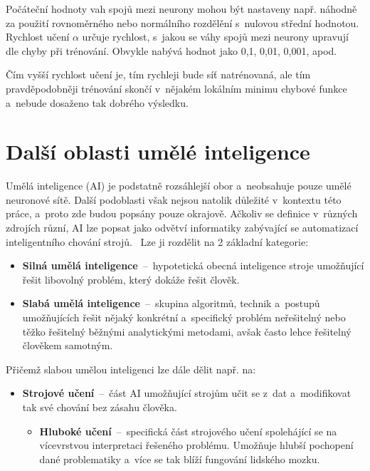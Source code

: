\documentclass[a4paper,12pt]{article}
\begin{document}
{{{{{{{{Počáteční hodnoty vah spojů mezi neurony mohou být nastaveny např. náhodně za použití rovnoměrného nebo normálního rozdělění s~nulovou střední hodnotou. Rychlost učení $\alpha$ určuje rychlost, s~jakou se váhy spojů mezi neurony upravují dle chyby při trénování. Obvykle nabývá hodnot jako 0,1, 0,01, 0,001, apod.~\cite{nn}

Čím vyšší rychlost učení je, tím rychleji bude síť natrénovaná, ale tím pravděpodobněji trénování skončí v~nějakém lokálním minimu chybové funkce a~nebude dosaženo tak dobrého výsledku.~\cite{convnn}

\section{Další oblasti umělé inteligence}

Umělá inteligence (AI) je podstatně rozsáhlejší obor a~neobsahuje pouze umělé neuronové sítě. Další podoblasti však nejsou natolik důležité v~kontextu této práce, a~proto zde budou popsány pouze okrajově. Ačkoliv se definice v~různých zdrojích různí, AI lze popsat jako odvětví informatiky zabývající se automatizací inteligentního chování strojů.~\cite{ai} Lze ji rozdělit na 2 základní kategorie:

\begin{itemize}
\item \textbf{Silná umělá inteligence}~--~hypotetická obecná inteligence stroje umožňující řešit libovolný problém, který dokáže řešit člověk.
\item \textbf{Slabá umělá inteligence}~--~skupina algoritmů, technik a~postupů umožňujících řešit nějaký konkrétní a~specifický problém neřešitelný nebo těžko řešitelný běžnými analytickými metodami, avšak často lehce řešitelný člověkem samotným.~\cite{ai}

\end{itemize}

Přičemž slabou umělou inteligenci lze dále dělit např. na:

\begin{itemize}
\item \textbf{Strojové učení}~--~část AI umožňující strojům učit se z~dat a~modifikovat tak své chování bez zásahu člověka.~\cite{ai}

\begin{itemize}

\item \textbf{Hluboké učení}~--~specifická část strojového učení spolehájící se na vícevrstvou interpretaci řešeného problému. Umožňuje hlubší pochopení dané problematiky a~více se tak blíží fungování lidského mozku.


\end{itemize}
\end{itemize}}}}}}}}}
\end{document}
